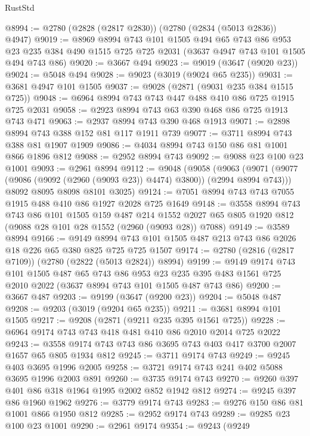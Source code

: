 \begin{lexlean}{RustStd}
\begin{coremodule}
@8994 := @2780 (@2828 (@2817 @2830)) (@2780 (@2834 (@5013 @2836)) @4947)
@9019 := @8969
    @8994
    @743
    @101
    @1505
    @494
    @65
    @743
    @86
    @953
    @23
    @235
    @384
    @490
    @1515
    @725
    @725
    @2031
    (@3637 @4947 @743 @101 @1505 @494 @743 @86)
@9020 := @3667 @494
@9023 := @9019 (@3647 (@9020 @23))
@9024 := @5048 @494
@9028 := @9023 (@3019 (@9024 @65 @235))
@9031 := @3681 @4947 @101 @1505
@9037 := @9028 (@2871 (@9031 @235 @384 @1515 @725))
@9048 := @6964 @8994 @743 @743 @447 @488 @410 @86 @725 @1915 @725 @2031
@9058 := @2923 @8994 @743 @63 @390 @468 @86 @725 @1913 @743 @471
@9063 := @2937 @8994 @743 @390 @468 @1913
@9071 := @2898 @8994 @743 @388 @152 @81 @117 @1911 @739
@9077 := @3711 @8994 @743 @388 @81 @1907 @1909
@9086 := @4034 @8994 @743 @150 @86 @81 @1001 @866 @1896 @812
@9088 := @2952 @8994 @743
@9092 := @9088 @23 @100 @23 @1001
@9093 := @2961 @8994
@9112 := @9048
    (@9058
      (@9063 (@9071 (@9077 (@9086 (@9092 (@2960 (@9093 @23)) @4474) @3800)) (@2994 @8994 @743)))
      @8092
      @8095
      @8098
      @8101
      @3025)
@9124 := @7051 @8994 @743 @743 @7055 @1915 @488 @410 @86 @1927 @2028 @725 @1649
@9148 := @3558
    @8994
    @743
    @743
    @86
    @101
    @1505
    @159
    @487
    @214
    @1552
    @2027
    @65
    @805
    @1920
    @812
    (@9088 @28 @101 @28 @1552 (@2960 (@9093 @28)) @7088)
@9149 := @3589 @8994
@9166 := @9149 @8994 @743 @101 @1505 @487 @213 @743 @86 @2026 @18 @226 @65 @380 @825 @725 @725 @1507
@9174 := @2780 (@2816 (@2817 @7109)) (@2780 (@2822 (@5013 @2824)) @8994)
@9199 := @9149
    @9174
    @743
    @101
    @1505
    @487
    @65
    @743
    @86
    @953
    @23
    @235
    @395
    @483
    @1561
    @725
    @2010
    @2022
    (@3637 @8994 @743 @101 @1505 @487 @743 @86)
@9200 := @3667 @487
@9203 := @9199 (@3647 (@9200 @23))
@9204 := @5048 @487
@9208 := @9203 (@3019 (@9204 @65 @235))
@9211 := @3681 @8994 @101 @1505
@9217 := @9208 (@2871 (@9211 @235 @395 @1561 @725))
@9228 := @6964 @9174 @743 @743 @418 @481 @410 @86 @2010 @2014 @725 @2022
@9243 := @3558 @9174 @743 @743 @86 @3695 @743 @403 @417 @3700 @2007 @1657 @65 @805 @1934 @812
@9245 := @3711 @9174 @743
@9249 := @9245 @403 @3695 @1996 @2005
@9258 := @3721 @9174 @743 @241 @402 @5088 @3695 @1996 @2003 @891
@9260 := @3735 @9174 @743
@9270 := @9260 @397 @401 @86 @318 @1964 @1995 @2002 @852 @1942 @812
@9274 := @9245 @397 @86 @1960 @1962
@9276 := @3779 @9174 @743
@9283 := @9276 @150 @86 @81 @1001 @866 @1950 @812
@9285 := @2952 @9174 @743
@9289 := @9285 @23 @100 @23 @1001
@9290 := @2961 @9174
@9354 := @9243
    (@9249

\end{coremodule}
\end{lexlean}
